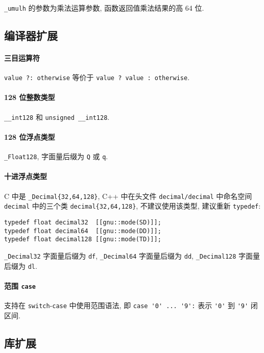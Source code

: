 \lstinline{_umulh} 的参数为乘法运算参数, 函数返回值乘法结果的高 64 位.

\subsection{编译器扩展}
\paragraph{三目运算符} \lstinline{value ?: otherwise} 等价于 \lstinline{value ? value : otherwise}.
\paragraph{128 位整数类型} \lstinline{__int128} 和 \lstinline{unsigned __int128}.

\paragraph{128 位浮点类型} \lstinline{_Float128}, 字面量后缀为 \lstinline{Q} 或 \lstinline{q}.

\paragraph{十进浮点类型} C 中是 \lstinline|_Decimal{32,64,128}|, C++ 中在头文件 \lstinline{decimal/decimal} 中命名空间 \lstinline{decimal} 中的三个类 \lstinline|decimal{32,64,128}|, 不建议使用该类型, 建议重新 \lstinline{typedef}:

\begin{lstlisting}
typedef float decimal32  [[gnu::mode(SD)]];
typedef float decimal64  [[gnu::mode(DD)]];
typedef float decimal128 [[gnu::mode(TD)]];
\end{lstlisting}

\lstinline{_Decimal32} 字面量后缀为 \lstinline{df}, \lstinline{_Decimal64} 字面量后缀为 \lstinline{dd}, \lstinline{_Decimal128} 字面量后缀为 \lstinline{dl}. 

\paragraph{范围 \lstinline[basicstyle=\mono]{case}}

支持在 \lstinline{switch}-\lstinline{case} 中使用范围语法, 即 \lstinline{case '0' ... '9':} 表示 \lstinline{'0'} 到 \lstinline{'9'} 闭区间.

\clearpage
\subsection{库扩展}
